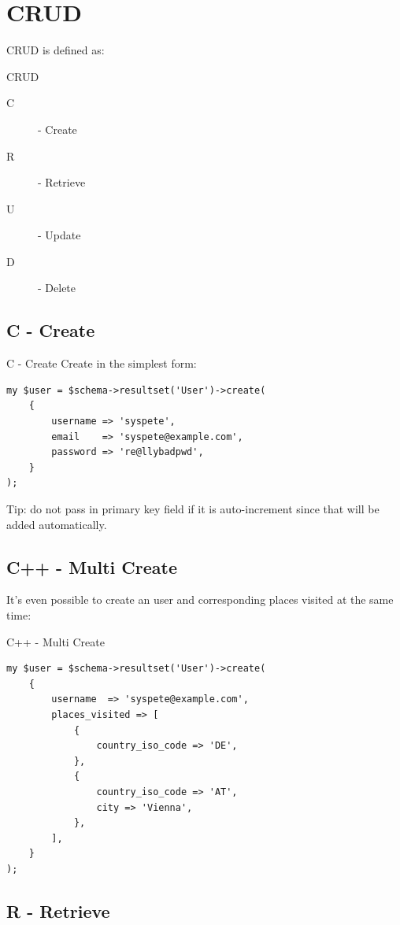 \section{CRUD}

CRUD is defined as:

\begin{frame}{CRUD}
\begin{description}
\item[C] - Create
\item[R] - Retrieve
\item[U] - Update
\item[D] - Delete
\end{description}
\end{frame}

\subsection{C - Create}
\begin{frame}[fragile]{C - Create}
Create in the simplest form:

\begin{lstlisting}
my $user = $schema->resultset('User')->create(
    {
        username => 'syspete',
        email    => 'syspete@example.com',
        password => 're@llybadpwd',
    }
);
\end{lstlisting}
\end{frame}

Tip: do not pass in primary key field if it is auto-increment since that will be added automatically.

\subsection{C++ - Multi Create}
It's even possible to create an user and corresponding places visited at the
same time:

\begin{frame}[fragile]{C++ - Multi Create}
\begin{lstlisting}
my $user = $schema->resultset('User')->create(
    {
        username  => 'syspete@example.com',
        places_visited => [
            {
                country_iso_code => 'DE',
            },
            {
                country_iso_code => 'AT',
                city => 'Vienna',
            },
        ],
    }
);
\end{lstlisting}
\end{frame}

\subsection{R - Retrieve}

